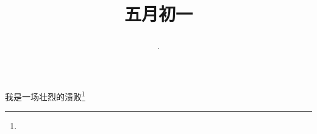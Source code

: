 \title{\date[d=6,m=6,y=2024][year:cn-y,年,month:cn,day:cn,日,·,weekday]·五月初一 }
我是一场壮烈的溃败\footnote{ }

